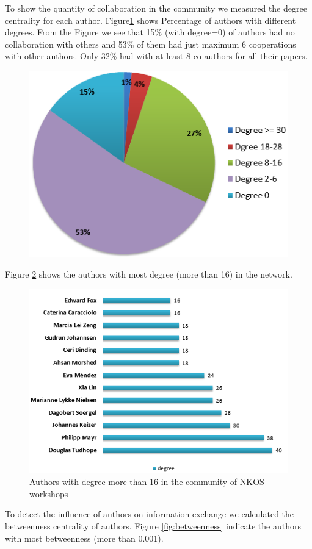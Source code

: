 \documentclass[runningheads,a4paper]{llncs}
\begin{document}
To show the quantity of collaboration in the community we measured the degree centrality for each author. Figure\ref{fig:degreePercentage} shows Percentage of authors with different degrees. From the Figure we see that 15\% (with degree=0) of authors had no collaboration with others and 53\% of them had just maximum 6 cooperations with other authors. Only 32\% had with at least 8 co-authors for all their papers. \\
\begin{figure}[H]
	\centering
	\includegraphics[width=0.7\linewidth]{degreePercentage}
	\caption{}
	\label{fig:degreePercentage}
\end{figure}

Figure \ref{fig:degree16} shows the authors with most degree (more than 16) in the network. \\
\begin{figure}[H]
	\centering
	\includegraphics[width=0.7\linewidth]{degree16}
	\caption{Authors with degree more than 16 in the community of NKOS workshops}
	\label{fig:degree16}
\end{figure}
To detect the influence of authors on information exchange we calculated the betweenness centrality of authors. Figure \ref{fig:betweenness} indicate the authors with most betweenness (more than 0.001).
\end{document}
